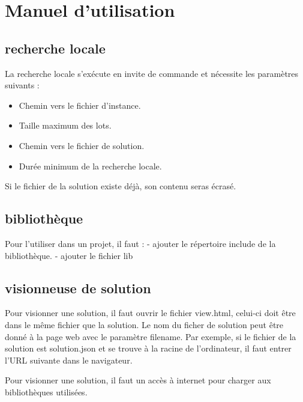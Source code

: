 \chapter{Manuel d'utilisation}

\section{recherche locale}
La recherche locale s'exécute en invite de commande et nécessite les paramètres suivants :
\begin{itemize}
    \item Chemin vers le fichier d'instance.
    \item Taille maximum des lots.
    \item Chemin vers le fichier de solution.
    \item Durée minimum de la recherche locale.
\end{itemize}
Si le fichier de la solution existe déjà, son contenu seras écrasé.

\section{bibliothèque}
Pour l'utiliser dans un projet, il faut :
- ajouter le répertoire include de la bibliothèque.
- ajouter le fichier lib
\section{visionneuse de solution}

Pour visionner une solution, il faut ouvrir le fichier view.html, celui-ci doit être dans le même fichier que la solution.
Le nom du ficher de solution peut être donné à la page web avec le paramètre filename.
Par exemple, si le fichier de la solution est solution.json et se trouve à la racine de l'ordinateur, il faut entrer l'URL suivante dans le navigateur.





Pour visionner une solution, il faut un accès à internet pour charger aux bibliothèques utilisées.


